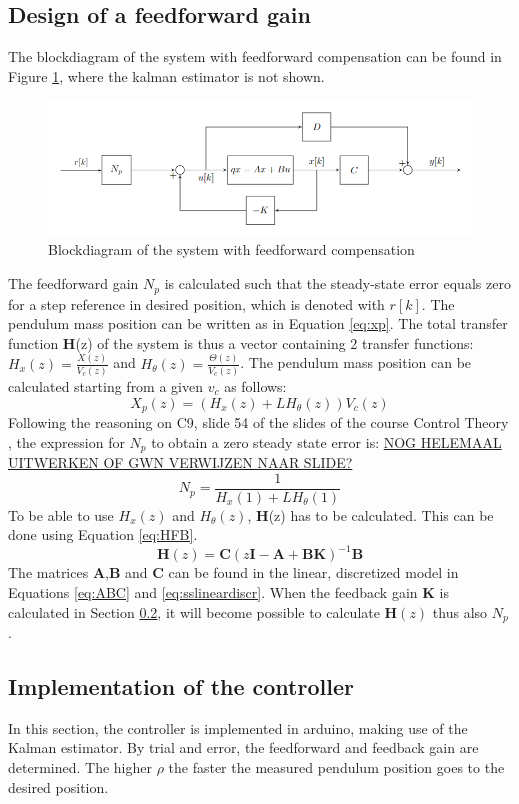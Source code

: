 \documentclass[a4paper,kul]{kulakarticle} %
\begin{document}
\subsection{Design of a feedforward gain}

The blockdiagram of the system with feedforward compensation can be found in Figure \ref{fig:blockdiagram}, where the kalman estimator is not shown. 

\begin{figure}[htp!]
	\centering
	\includegraphics[width=.7\linewidth]{blockdiagram.png}
	\caption{Blockdiagram of the system with feedforward compensation }
	\label{fig:blockdiagram}
\end{figure}
The feedforward gain $N_p$ is calculated such that the steady-state error equals zero for a step reference in desired position, which is denoted with $r[k]$. The pendulum mass position can be written as in Equation \ref{eq:xp}. The total transfer function \textbf{H}(z) of the system is thus a vector containing 2 transfer functions: $H_x(z) = \frac{X(z)}{V_c(z)}$ and $H_{\theta}(z) = \frac{\Theta(z)}{V_c(z)}$. The pendulum mass position can be calculated starting from a given $v_c$ as follows:
\begin{equation}
X_p(z) = (H_x(z) + LH_\theta(z))V_c(z)
\end{equation}
Following the reasoning on C9, slide 54 of the slides of the course Control Theory \cite{slidescontroltheory}, the expression for $N_p$ to  obtain a zero steady state error is: \underline{NOG HELEMAAL UITWERKEN OF GWN VERWIJZEN NAAR SLIDE?}
\begin{equation}
N_p = \frac{1}{H_x(1) + LH_\theta(1)}
\end{equation}
To be able to use $H_x(z)$ and $H_\theta(z)$, \textbf{H}(z) has to be calculated. This can be done using Equation \ref{eq:HFB}. 
\begin{equation}
\mathbf{H}(z) = \mathbf{C}(z\mathbf{I}-\mathbf{A}+\mathbf{BK})^{-1}\mathbf{B}
\label{eq:HFB}
\end{equation}
The matrices $\mathbf{A}$,$\mathbf{B}$ and $\mathbf{C}$ can be found in the linear, discretized model in Equations \ref{eq:ABC} and \ref{eq:sslineardiscr}. When the feedback gain $\mathbf{K}$ is calculated in Section \ref{sec:implFBcontr}, it will become possible to calculate $\mathbf{H}(z)$ thus also $N_p$. 
\subsection{Implementation of the controller}
\label{sec:implFBcontr}
In this section, the controller is implemented in arduino, making use of the Kalman estimator. By trial and error, the feedforward and feedback gain are determined. The higher $\rho$ the faster the measured pendulum position goes to the desired position.








	
\end{document}
